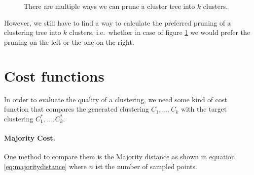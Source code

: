 \begin{figure}[h]
\centering
\begin{minipage}{.45\textwidth}
  \centering
{}
\end{minipage}
\begin{minipage}{.45\textwidth}
  \centering
{}
\end{minipage}
\caption{There are multiple ways we can prune a cluster tree into $k$ clusters.}
\label{fig:pruning}
\end{figure}

However, we still have to find a way to calculate the preferred pruning of a clustering tree into $k$ clusters, i.e.\ whether in case of figure \ref{fig:pruning} we would prefer the pruning on the left or the one on the right.

\section{Cost functions}
\label{chapter:costfunctions}

In order to evaluate the quality of a clustering, we need some kind of cost function that compares the generated clustering $C_1,...,C_k$ with the target clustering $C_1^*, ..., C_k^*$. 

\paragraph{Majority Cost.} One method to compare them is the Majority distance as shown in equation \ref{eq:majoritydistance} where $n$ ist the number of sampled points.

